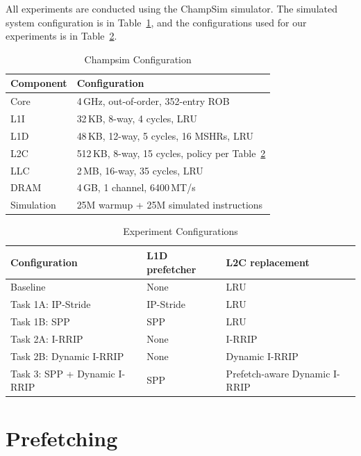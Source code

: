 \documentclass[11pt,a4paper]{article}
\begin{document}
All experiments are conducted using the ChampSim simulator. The
simulated system configuration is in
Table~\ref{tab:config}, and the configurations used for our experiments is in Table~\ref{tab:runs}.

\begin{table}[H]
  \centering
  \caption{Champsim Configuration}
  \label{tab:config}
  \begin{tabular}{@{}ll@{}}
    \toprule
    \textbf{Component} & \textbf{Configuration} \\
    \midrule
    Core       & 4\,GHz, out-of-order, 352-entry ROB \\
    L1I        & 32\,KB, 8-way, 4 cycles, LRU \\
    L1D        & 48\,KB, 12-way, 5 cycles, 16 MSHRs, LRU \\
    L2C        & 512\,KB, 8-way, 15 cycles, policy per Table~\ref{tab:runs} \\
    LLC        & 2\,MB, 16-way, 35 cycles, LRU \\
    DRAM       & 4\,GB, 1 channel, 6400\,MT/s \\
    Simulation & 25M warmup + 25M simulated instructions \\
    \bottomrule
  \end{tabular}
\end{table}

\begin{table}[H]
  \centering
  \caption{Experiment Configurations}
  \label{tab:runs}
  \begin{tabular}{@{}lll@{}}
    \toprule
    \textbf{Configuration} & \textbf{L1D prefetcher}
    & \textbf{L2C replacement} \\
    \midrule
    Baseline                   & None & LRU \\
    Task 1A: IP-Stride  & IP-Stride & LRU\\
    Task 1B: SPP                & SPP  & LRU \\
    Task 2A: I-RRIP            & None & I-RRIP \\
    Task 2B: Dynamic I-RRIP    & None & Dynamic I-RRIP \\
    Task 3: SPP + Dynamic I-RRIP
                               & SPP  & Prefetch-aware Dynamic I-RRIP \\
    \bottomrule
  \end{tabular}
\end{table}

\section{Prefetching}
\end{document}
